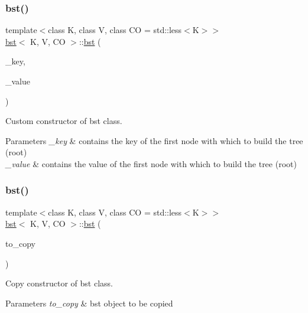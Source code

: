 \subsubsection{\texorpdfstring{bst()}{bst()}\hspace{0.1cm}{\footnotesize\ttfamily [2/4]}}
{\footnotesize\ttfamily template$<$class K, class V, class CO = std\+::less$<$\+K$>$$>$ \\
\hyperlink{classbst}{bst}$<$ K, V, CO $>$\+::\hyperlink{classbst}{bst} (\begin{DoxyParamCaption}\item[{key\+\_\+type \&\&}]{\+\_\+key,  }\item[{value\+\_\+type \&\&}]{\+\_\+value }\end{DoxyParamCaption})\hspace{0.3cm}{\ttfamily [inline]}}



Custom constructor of bst class. 


\begin{DoxyParams}{Parameters}
{\em \+\_\+key} & contains the key of the first node with which to build the tree (root) \\
\hline
{\em \+\_\+value} & contains the value of the first node with which to build the tree (root) \\
\hline
\end{DoxyParams}
\mbox{\label{classbst_a4647efd85ea5b63cd3676bf51c8bbfca}} 
\subsubsection{\texorpdfstring{bst()}{bst()}\hspace{0.1cm}{\footnotesize\ttfamily [3/4]}}
{\footnotesize\ttfamily template$<$class K, class V, class CO = std\+::less$<$\+K$>$$>$ \\
\hyperlink{classbst}{bst}$<$ K, V, CO $>$\+::\hyperlink{classbst}{bst} (\begin{DoxyParamCaption}\item[{const \hyperlink{classbst}{bst}$<$ K, V, CO $>$ \&}]{to\+\_\+copy }\end{DoxyParamCaption})\hspace{0.3cm}{\ttfamily [inline]}}



Copy constructor of bst class. 


\begin{DoxyParams}{Parameters}
{\em to\+\_\+copy} & bst object to be copied \\
\hline
\end{DoxyParams}
\mbox{\label{classbst_a853e031d8744ce2683fa545bc0347701}} 

